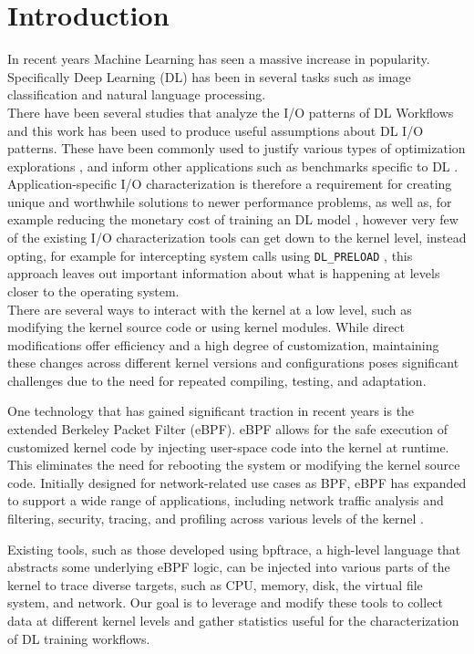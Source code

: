 \documentclass[conference]{IEEEtran}
\begin{document}
\section{Introduction}
In recent years Machine Learning has seen a massive increase in popularity.
Specifically Deep Learning (DL) has been in several tasks such as image classification
and natural language processing.\\
There have been several studies that analyze the I/O patterns of DL Workflows and this work
has been used to produce useful assumptions about DL I/O patterns. These have been commonly used to
justify various types of optimization explorations \cite{LMDB, nvme, beegfsDL, bamboo}, and inform
other applications such as benchmarks specific to DL \cite{TFbenchmark}. \\
Application-specific I/O characterization is therefore a requirement for creating
unique and worthwhile solutions to
newer performance problems, as well as, for example reducing the monetary cost of training an
DL model \cite{bamboo}, however very few of the existing I/O characterization tools
can get down to the kernel level, instead opting, for example for intercepting system calls using \texttt{DL\_PRELOAD} \cite{HPCIODarshan}, this approach leaves out important information about what is happening at levels closer to the operating system.\\
There are several ways to interact with the kernel at a low level, such as modifying the kernel source code or using kernel modules. While direct modifications offer efficiency and a high degree of customization, maintaining these changes across different kernel versions and configurations poses significant challenges due to the need for repeated compiling, testing, and adaptation.

One technology that has gained significant traction in recent years is the extended Berkeley Packet Filter (eBPF).
eBPF allows for the safe execution of customized kernel code by injecting user-space code into the kernel at runtime.
This eliminates the need for rebooting the system or modifying the kernel source code.
Initially designed for network-related use cases as BPF, eBPF has expanded to support a wide range of applications, including network traffic analysis and filtering, security, tracing, and profiling across various levels of the kernel \cite{eBPFSurvey2}.

Existing tools, such as those developed using bpftrace, a high-level language that abstracts some underlying eBPF logic, can be injected into various parts of the kernel to trace diverse targets,
such as CPU, memory, disk, the virtual file system, and network.
Our goal is to leverage and modify these tools to collect data at different kernel levels and gather statistics useful for the characterization of DL training workflows.
\end{document}
